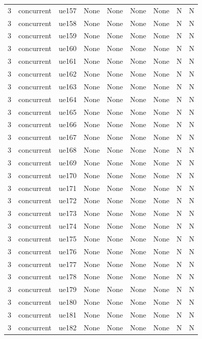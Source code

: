 \begin{table}[ht]
\begin{tabular}{|c|c|c|c|c|c|c|c|c|}
3 & concurrent & ue157 & None & None & None & None & N & N \\
3 & concurrent & ue158 & None & None & None & None & N & N \\
3 & concurrent & ue159 & None & None & None & None & N & N \\
3 & concurrent & ue160 & None & None & None & None & N & N \\
3 & concurrent & ue161 & None & None & None & None & N & N \\
3 & concurrent & ue162 & None & None & None & None & N & N \\
3 & concurrent & ue163 & None & None & None & None & N & N \\
3 & concurrent & ue164 & None & None & None & None & N & N \\
3 & concurrent & ue165 & None & None & None & None & N & N \\
3 & concurrent & ue166 & None & None & None & None & N & N \\
3 & concurrent & ue167 & None & None & None & None & N & N \\
3 & concurrent & ue168 & None & None & None & None & N & N \\
3 & concurrent & ue169 & None & None & None & None & N & N \\
3 & concurrent & ue170 & None & None & None & None & N & N \\
3 & concurrent & ue171 & None & None & None & None & N & N \\
3 & concurrent & ue172 & None & None & None & None & N & N \\
3 & concurrent & ue173 & None & None & None & None & N & N \\
3 & concurrent & ue174 & None & None & None & None & N & N \\
3 & concurrent & ue175 & None & None & None & None & N & N \\
3 & concurrent & ue176 & None & None & None & None & N & N \\
3 & concurrent & ue177 & None & None & None & None & N & N \\
3 & concurrent & ue178 & None & None & None & None & N & N \\
3 & concurrent & ue179 & None & None & None & None & N & N \\
3 & concurrent & ue180 & None & None & None & None & N & N \\
3 & concurrent & ue181 & None & None & None & None & N & N \\
3 & concurrent & ue182 & None & None & None & None & N & N \\

\end{tabular}
\end{table}
